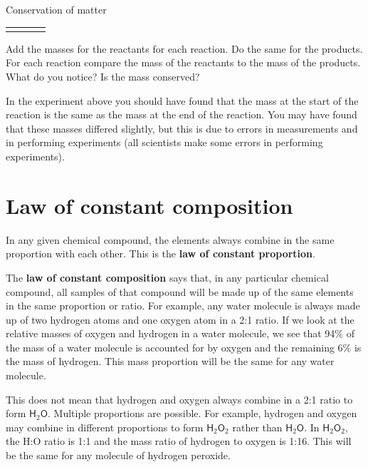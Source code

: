 \begin{g_experiment}{Conservation of matter}
\begin{table}[H]
\begin{center}
\begin{xtabular}[t]{|l|l|l|l|}
         &
         &
     \tabularnewline{}
    \end{xtabular}
      \end{center}
\end{table}
    \par
  \label{m38711*eip-634}Add the masses for the reactants for each reaction. Do the same for the products. For each reaction compare the mass of the reactants to the mass of the products. What do you notice? Is the mass conserved?\par \label{m38711*eip-65}In the experiment above you should have found that the mass at the start of the reaction is the same as the mass at the end of the reaction. You may have found that these masses differed slightly, but this is due to errors in measurements and in performing experiments (all scientists make some errors in performing experiments).  \par
\end{g_experiment} 
    \label{m38711*cid6}
            \section{Law of constant composition}
            \nopagebreak
      \label{m38711*id65065}In any given chemical compound, the elements always combine in the same proportion with each other. This is the \textbf{law of constant proportion}.\par 
      \label{m38711*id65075}The \textbf{law of constant composition} says that, in any particular chemical compound, all samples of that compound will be made up of the same elements in the same proportion or ratio. For example, any water molecule is always made up of two hydrogen atoms and one oxygen atom in a 2:1 ratio. If we look at the relative masses of oxygen and hydrogen in a water molecule, we see that 94\% of the mass of a water molecule is accounted for by oxygen and the remaining 6\% is the mass of hydrogen. This mass proportion will be the same for any water molecule.\par 
      \label{m38711*id65089}This does not mean that hydrogen and oxygen always combine in a 2:1 ratio to form $\mathsf{H}{}_{2}\mathsf{O}$. Multiple proportions are possible. For example, hydrogen and oxygen may combine in different proportions to form $\mathsf{H}{}_{2}\mathsf{O}{}_{2}$ rather than $\mathsf{H}{}_{2}\mathsf{O}$. In $\mathsf{H}{}_{2}\mathsf{O}{}_{2}$, the H:O ratio is 1:1 and the mass ratio of hydrogen to oxygen is 1:16. This will be the same for any molecule of hydrogen peroxide.\par 
    \label{m38711*cid7}
